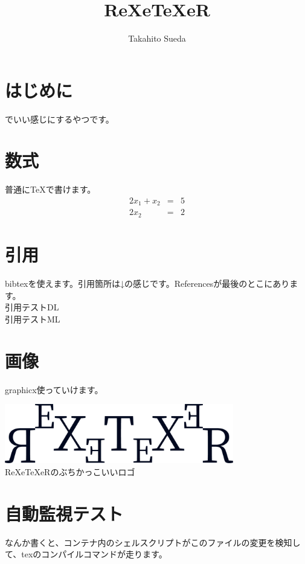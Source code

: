 \documentclass[a4paper, xelatex]{bxjsarticle}
\begin{document}
  \title{ReXeTeXeR}
  \author{Takahito Sueda}
  \maketitle

  \section{はじめに}
  {\XeTeX} でいい感じにするやつです。

  \section{数式}
  普通に{\TeX}で書けます。
  \begin{eqnarray}
    2x_1 + x_2 & = & 5 \\
    2x_2 & = & 2
  \end{eqnarray}

  \section{引用}
  bibtexを使えます。引用箇所は↓の感じです。Referencesが最後のとこにあります。\\
  引用テストDL\cite{lecun2015deep} \\
  引用テストML\cite{michie1994machine}

  \section{画像}
  graphicx使っていけます。
  \begin{center}
    \includegraphics[width=10cm]{img/logo.png} \\
    ReXeTeXeRのぶちかっこいいロゴ
  \end{center}

  \section{自動監視テスト}
  なんか書くと、コンテナ内のシェルスクリプトがこのファイルの変更を検知して、texのコンパイルコマンドが走ります。

  
  
\end{document}

